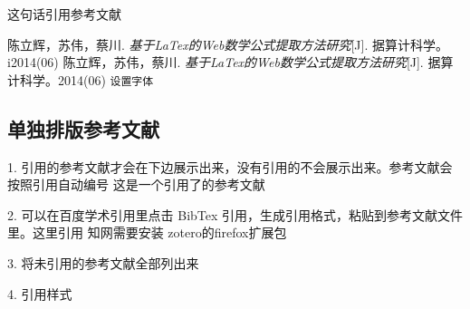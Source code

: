 \documentclass[]{ctexart}
\begin{document}
 	这句话引用参考文献
 	\begin{thebibliography}{99}
 		陈立辉，苏伟，蔡川. \emph{基于LaTex的Web数学公式提取方法研究}[J]. 据算计科学。i2014(06)
 		陈立辉，苏伟，蔡川. \emph{基于LaTex的Web数学公式提取方法研究}[J]. 据算计科学。2014(06) \texttt{设置字体}
 	\end{thebibliography}
 
 	\subsection{单独排版参考文献}
 	1. 引用的参考文献才会在下边展示出来，没有引用的不会展示出来。参考文献会按照引用自动编号
 	这是一个引用了的参考文献 \cite{bookLable}
 	
 	2. 可以在百度学术引用里点击 BibTex 引用，生成引用格式，粘贴到参考文献文件里。这里引用 
 	\cite{韩秋明2018区块链技术国外研究述评}
 	知网需要安装 zotero的firefox扩展包
 	
 	3. 将未引用的参考文献全部列出来 
 	
 	4. 引用样式 \citet{bookLable}
 	
 		
 	\nocite{*}
 	
 	
 	 
\end{document}
